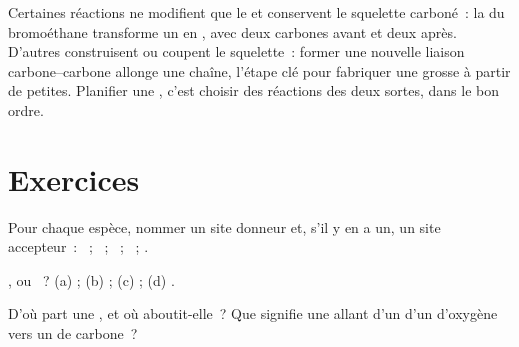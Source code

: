 \begin{remark}\label{rem:g12:curly-arrows:skeleton}
Certaines réactions ne modifient que le  et
conservent le squelette carboné~: la  du bromoéthane
transforme un  en , avec deux carbones avant et deux
après. D'autres construisent ou coupent le squelette~: former une
nouvelle liaison carbone--carbone allonge une chaîne, l'étape clé pour
fabriquer une grosse  à partir de petites. Planifier une
, c'est choisir des réactions des deux sortes, dans le bon
ordre.
\end{remark}

\section{Exercices}

\begin{exercise}[$\star$]\label{exo:g12:curly-arrows:1}
Pour chaque espèce, nommer un site donneur et, s'il y en a un, un site
accepteur~: ~; ~; ~; ~; .
\end{exercise}

\begin{exercise}[$\star$]\label{exo:g12:curly-arrows:2}
,  ou ~?
(a) ;
(b) ;
(c) ;
(d) .
\end{exercise}

\begin{exercise}[$\star$]\label{exo:g12:curly-arrows:3}
D'où part une , et où aboutit-elle~? Que signifie une
 allant d'un  d'un  d'oxygène vers un
 de carbone~?
\end{exercise}


